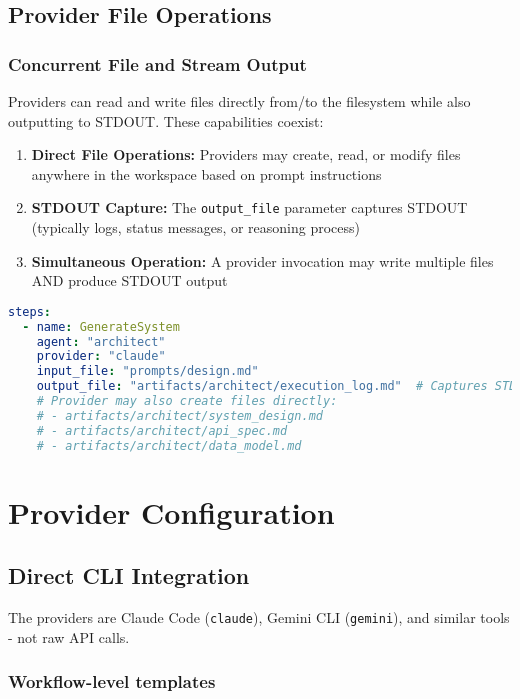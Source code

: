 \documentclass[11pt,a4paper]{article}
\begin{document}
\subsection{Provider File Operations}

\subsubsection{Concurrent File and Stream Output}

Providers can read and write files directly from/to the filesystem while also outputting to STDOUT. These capabilities coexist:

\begin{enumerate}
    \item \textbf{Direct File Operations:} Providers may create, read, or modify files anywhere in the workspace based on prompt instructions
    \item \textbf{STDOUT Capture:} The \texttt{output\_file} parameter captures STDOUT (typically logs, status messages, or reasoning process)
    \item \textbf{Simultaneous Operation:} A provider invocation may write multiple files AND produce STDOUT output
\end{enumerate}

\begin{lstlisting}[language=yaml, caption={Provider File Operations Example}]
steps:
  - name: GenerateSystem
    agent: "architect"
    provider: "claude"
    input_file: "prompts/design.md"
    output_file: "artifacts/architect/execution_log.md"  # Captures STDOUT
    # Provider may also create files directly:
    # - artifacts/architect/system_design.md
    # - artifacts/architect/api_spec.md
    # - artifacts/architect/data_model.md
\end{lstlisting}



\section{Provider Configuration}

\subsection{Direct CLI Integration}

The providers are Claude Code (\texttt{claude}), Gemini CLI (\texttt{gemini}), and similar tools - not raw API calls.

\subsubsection{Workflow-level templates}
\end{document}
